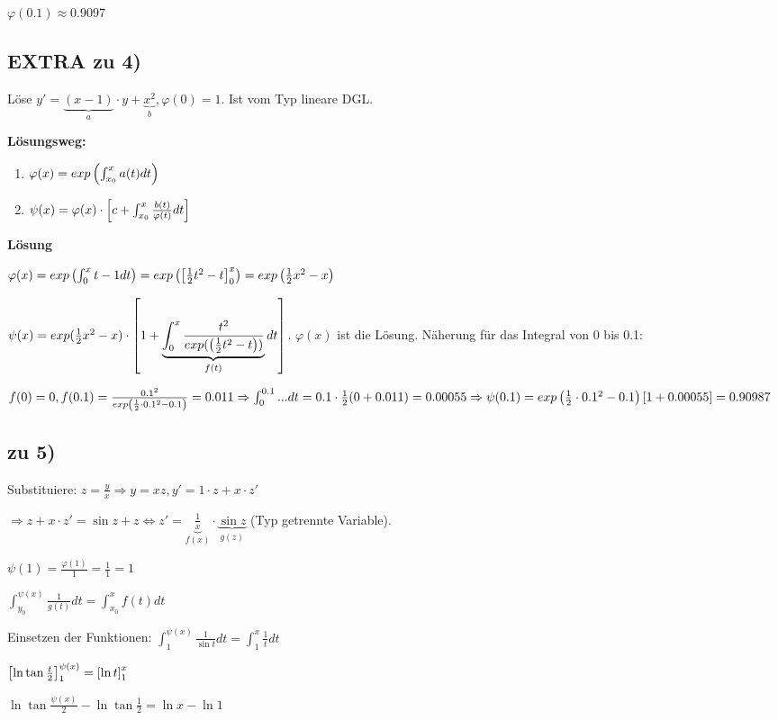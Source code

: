 $\varphi(0.1) \approx 0.9097$

\subsection{EXTRA zu 4)}
Löse $y' = \underbrace{(x-1)}_{a} \cdot y + \underbrace{x^2}_{b}, \varphi(0) = 1$. Ist vom Typ lineare DGL. 

\textbf{Lösungsweg:} 
\begin{enumerate}
\item $\varphi(x) = exp \left( \int_{x_0}^{x} a(t) dt \right) $
\item $\psi(x) = \varphi(x) \cdot  \left[ c + \int_{x_0}^{x} \frac{b(t)}{\varphi(t)} dt \right] $
\end{enumerate}

\textbf{Lösung}

$
\varphi(x) = exp \left( \int_{0}^{x} t-1 dt \right) 
=exp \left(  \left[ \frac{1}{2} t^2 - t  \right] _0^x \right) 
=exp \left( \frac{1}{2} x^2 - x \right) 
$

$ \psi(x) = exp(\frac{1}{2} x^2 - x) \cdot  \left[ 1 + \underbrace{\int_{0}^{x} \frac{t^2}{exp( \left( \frac{1}{2} t^2 - t \right) )}}_{f(t)} dt \right]  $. 
$\varphi(x)$ ist die Lösung. Näherung für das Integral von 0 bis 0.1: 

$
f(0)=0, f(0.1) = \frac{0.1^2}{exp \left( \frac{1}{2} \cdot 0.1^2 - 0.1 \right) } = 0.011
\Rightarrow \int_{0}^{0.1} ... dt = 0.1 \cdot \frac{1}{2} (0+0.011) = 0.00055
\Rightarrow \psi(0.1) = exp \left( \frac{1}{2} \cdot 0.1^2 - 0.1 \right)   \left[ 1+0.00055 \right]  = 0.90987
$

\subsection{zu 5)}
Substituiere: $z = \frac{y}{x} \Rightarrow y=xz, y'=1\cdot z + x\cdot z'$

$\Rightarrow z+x\cdot z' = \sin z + z \Leftrightarrow z' = \underbrace{\frac{1}{x}}_{f(x)} \cdot \underbrace{\sin z}_{g(z)}$ (Typ getrennte Variable). 

$\psi(1) = \frac{\varphi(1)}{1} = \frac{1}{1} = 1$

$\int_{y_0}^{\psi(x)} \frac{1}{g(t)} dt = \int_{x_0}^{x} f(t) dt$

Einsetzen der Funktionen: $ \int_{1}^{\psi(x)} \frac{1}{\sin t} dt = \int_{1}^{x} \frac{1}{t} dt $

$ \left[ \ln \tan \frac{t}{2} \right] _1^{\psi(x)} =  \left[ \ln t \right] _1^x$

$\ln \tan \frac{\psi(x)}{2} - \ln \tan \frac{1}{2} = \ln x - \ln 1$

